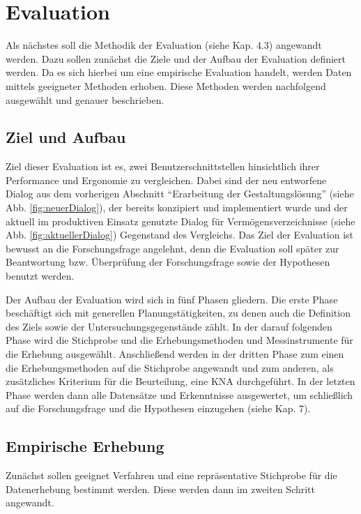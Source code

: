 \section{Evaluation}
Als nächstes soll die Methodik der Evaluation (siehe Kap. 4.3) angewandt werden. Dazu sollen zunächst die Ziele und der Aufbau der Evaluation definiert werden. Da es sich hierbei um eine empirische Evaluation handelt, werden Daten mittels geeigneter Methoden erhoben. Diese Methoden werden nachfolgend ausgewählt und genauer beschrieben.


\subsection{Ziel und Aufbau}
Ziel dieser Evaluation ist es, zwei Benutzerschnittstellen hinsichtlich ihrer Performance und Ergonomie zu vergleichen. Dabei sind der neu entworfene Dialog aus dem vorherigen Abschnitt \enquote{Erarbeitung der Gestaltungslösung} (siehe Abb. \ref{fig:neuerDialog}), der bereits konzipiert und implementiert wurde und der aktuell im produktiven Einsatz genutzte Dialog für Vermögensverzeichnisse (siehe Abb. \ref{fig:aktuellerDialog}) Gegenstand des Vergleichs. Das Ziel der Evaluation ist bewusst an die Forschungsfrage angelehnt, denn die Evaluation soll später zur Beantwortung bzw. Überprüfung der Forschungsfrage sowie der Hypothesen benutzt werden.

Der Aufbau der Evaluation wird sich in fünf Phasen gliedern. Die erste Phase beschäftigt sich mit generellen Planungstätigkeiten, zu denen auch die Definition des Ziels sowie der Untersuchungsgegenstände zählt. In der darauf folgenden Phase wird die Stichprobe und die Erhebungsmethoden und Messinstrumente für die Erhebung ausgewählt. Anschließend werden in der dritten Phase zum einen die Erhebungsmethoden auf die Stichprobe angewandt und zum anderen, als zusätzliches Kriterium für die Beurteilung, eine \gls{KNA} durchgeführt. In der letzten Phase werden dann alle Datensätze und Erkenntnisse ausgewertet, um schließlich auf die Forschungsfrage und die Hypothesen einzugehen (siehe Kap. 7).


\subsection{Empirische Erhebung}
Zunächst sollen geeignet Verfahren und eine repräsentative Stichprobe für die Datenerhebung bestimmt werden. Diese werden dann im zweiten Schritt angewandt.

